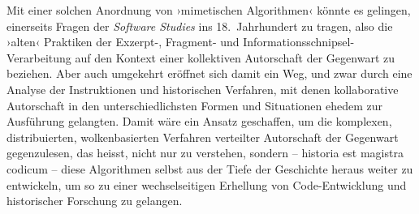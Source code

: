 \documentclass[a4paper,10pt]{article}
\newcommand{\inanf}[1]{›#1‹}
\begin{document}
Mit einer solchen Anordnung von \inanf{mimetischen Algorithmen} könnte es  gelingen, einerseits Fragen der \emph{Software Studies} ins 18.~Jahrhundert zu tragen, also die \inanf{alten} Praktiken der Exzerpt-, Fragment- und Informationsschnipsel-Verarbeitung auf den Kontext einer kollektiven Autorschaft der Gegenwart zu beziehen. Aber auch umgekehrt eröffnet sich damit ein Weg, und zwar durch eine Analyse der Instruktionen und historischen Verfahren, mit denen kollaborative Autorschaft in den unterschiedlichsten Formen und Situationen ehedem zur Ausführung gelangten. Damit wäre ein Ansatz geschaffen, um die komplexen, distribuierten, wolkenbasierten Verfahren verteilter Autorschaft der Gegenwart gegenzulesen, das heisst, nicht nur zu verstehen, sondern – historia est magistra codicum – diese Algorithmen selbst aus der Tiefe der Geschichte heraus weiter zu entwickeln, um so zu einer wechselseitigen Erhellung von Code-Entwicklung und historischer Forschung zu gelangen. 


\begin{comment}

mit besonderem Fokus auf Versionierungssystemen (mercurial, github, subversion), wie sie in der Informatik und bei global ausgelegten OpenSource-Code-Entwicklungen zum Einsatz kommen, zu untersuchen.

Man könnte beispielsweise im Detail untersuchen, wie sich die einzelnen Tätigkeiten und Prozessabläufe bei einer historisch-kritischen Edition, die einzelnen Entscheidungen, 
Die Forschung an den Merge-Algorithmen vergleichen mit der Arbeit an.

Hier ist auch die systematische Stelle, wo Fehler korrigiert werden. Es ist eine Art aufklärerisches, lektorierendes Korrektorat. 

Neue persona

Pseudo-Random!

\end{comment}

\nocite{leeuw:1999}

\printbibliography


\end{document}
